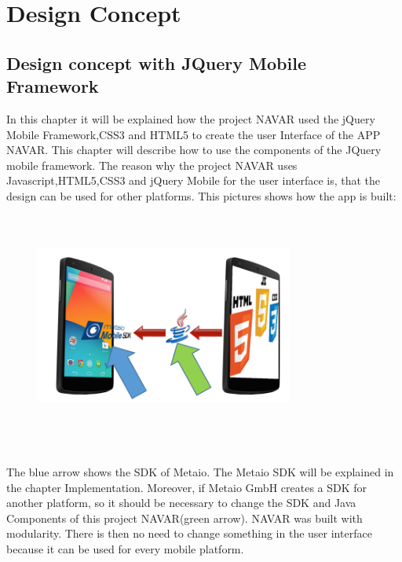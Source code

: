 

\chapter{Design Concept} \label{chapter:desgin}

\section{Design concept with JQuery Mobile Framework}
In this chapter it will be explained how the project NAVAR used the jQuery Mobile Framework,CSS3 and HTML5 to create the user Interface of the APP NAVAR. This chapter will describe how to use  the components of the JQuery mobile framework. The reason why the project NAVAR uses Javascript,HTML5,CSS3 and jQuery Mobile for the user interface is, that the design can be used for other platforms. This pictures shows how the app is built:
\\\\
\begin{figure}[htbp]
\centering
\includegraphics[width=240pt,height=180pt,keepaspectratio]{graphics/AppStructure.png}
\end{figure}
\\\\
The blue arrow shows the SDK of Metaio. The Metaio SDK will be explained in the chapter Implementation. Moreover, if Metaio GmbH creates a SDK for another platform, so it should be necessary to change the SDK and Java Components of this project NAVAR(green arrow). NAVAR was built with modularity. There is then no need to change something in the user interface because it can be used for every mobile platform.
\\\\

